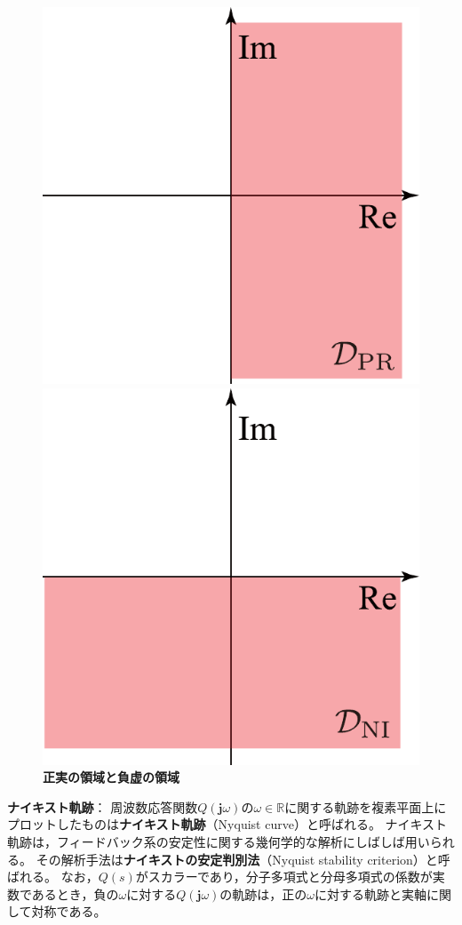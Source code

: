 \documentclass[tombow,dvipdfmx]{corona-a5-1.1}
\begin{document}
\begin{figure}[t]
  \centering
  {
  \begin{minipage}{0.49\linewidth}
    \centering
    \includegraphics[width = .65\linewidth]{figs/PRdom}
    \medskip
  \end{minipage}
  \begin{minipage}{0.49\linewidth}
    \centering
    \includegraphics[width = .65\linewidth]{figs/NIdom}
    \medskip
  \end{minipage}
  }
  \medskip
  \caption{\textbf{正実の領域と負虚の領域}}
  \label{fig:PRandNI}
\medskip
\end{figure}


\begin{COLUMN}
\noindent \textbf{ナイキスト軌跡}：
周波数応答関数$Q(\bm{j} \omega)$の$\omega \in \mathbb{R}$に関する軌跡を複素平面上にプロットしたものは\textbf{ナイキスト軌跡}（Nyquist curve）と呼ばれる。
ナイキスト軌跡は，フィードバック系の安定性に関する幾何学的な解析にしばしば用いられる。
その解析手法は\textbf{ナイキストの安定判別法}（Nyquist stability criterion）と呼ばれる。
なお，$Q(s)$がスカラーであり，分子多項式と分母多項式の係数が実数であるとき，負の$\omega$に対する$Q(\bm{j} \omega)$の軌跡は，正の$\omega$に対する軌跡と実軸に関して対称である。
\end{COLUMN}
\end{document}
